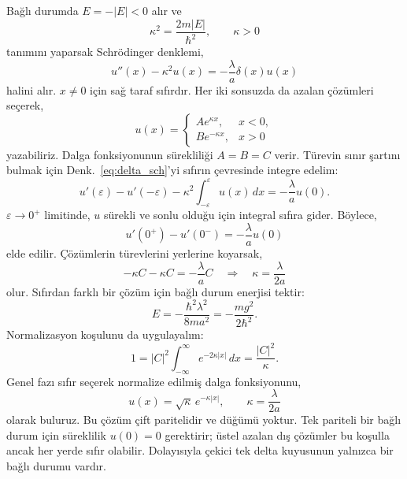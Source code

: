 \documentclass[00_kitap.tex]{subfiles}
\begin{document}
Bağlı durumda $E=-|E|<0$ alır ve
\begin{equation}
 \kappa^2=\frac{2m|E|}{\hbar^2},\qquad \kappa>0
\end{equation}
tanımını yaparsak Schrödinger denklemi,
\begin{equation}
 u''(x)-\kappa^2u(x)=-\frac{\lambda}{a}\delta(x)u(x)
 \label{eq:delta_sch}
\end{equation}
halini alır. $x\ne0$ için sağ taraf sıfırdır. Her iki sonsuzda da
azalan çözümleri seçerek,
\begin{equation}
 u(x)=\begin{cases}
 A e^{\kappa x},&x<0,\\
 B e^{-\kappa x},&x>0
 \end{cases}
\end{equation}
yazabiliriz. Dalga fonksiyonunun sürekliliği $A=B=C$ verir. Türevin
sınır şartını bulmak için Denk.~\eqref{eq:delta_sch}'yi sıfırın
çevresinde integre edelim:
\begin{equation}
 u'(\varepsilon)-u'(-\varepsilon)
 -\kappa^2\int_{-\varepsilon}^{\varepsilon}u(x)\,dx
 =-\frac{\lambda}{a}u(0).
\end{equation}
$\varepsilon\to0^+$ limitinde, $u$ sürekli ve sonlu olduğu için
integral sıfıra gider. Böylece,
\begin{equation}
 \boxed{u'(0^+)-u'(0^-)=-\frac{\lambda}{a}u(0)}
 \label{eq:delta_sicrama}
\end{equation}
elde edilir. Çözümlerin türevlerini yerlerine koyarsak,
\begin{equation}
 -\kappa C-\kappa C=-\frac{\lambda}{a}C
 \quad\Longrightarrow\quad
 \kappa=\frac{\lambda}{2a}
\end{equation}
olur. Sıfırdan farklı bir çözüm için bağlı durum enerjisi tektir:
\begin{equation}
 \boxed{E=-\frac{\hbar^2\lambda^2}{8ma^2}
          =-\frac{mg^2}{2\hbar^2}.}
 \label{eq:delta_enerji}
\end{equation}
Normalizasyon koşulunu da uygulayalım:
\begin{equation}
 1=|C|^2\int_{-\infty}^{\infty}e^{-2\kappa|x|}\,dx
   =\frac{|C|^2}{\kappa}.
\end{equation}
Genel fazı sıfır seçerek normalize edilmiş dalga fonksiyonunu,
\begin{equation}
 \boxed{u(x)=\sqrt{\kappa}\,e^{-\kappa|x|},
 \qquad \kappa=\frac{\lambda}{2a}}
 \label{eq:delta_normalize}
\end{equation}
olarak buluruz. Bu çözüm çift paritelidir ve düğümü yoktur. Tek
pariteli bir bağlı durum için süreklilik $u(0)=0$ gerektirir;
üstel azalan dış çözümler bu koşulla ancak her yerde sıfır olabilir.
Dolayısıyla çekici tek delta kuyusunun yalnızca bir bağlı durumu vardır.
\end{document}
